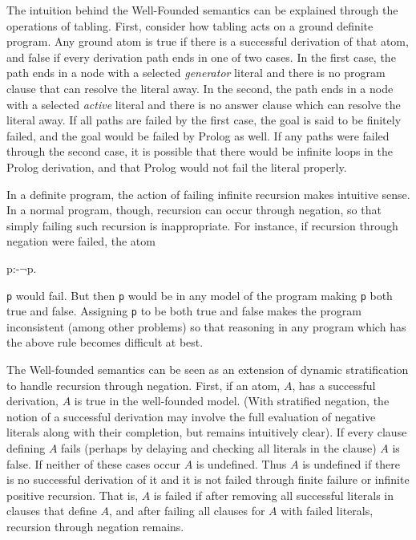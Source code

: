 The intuition behind the Well-Founded semantics can be explained
through the operations of tabling.  First, consider how tabling acts
on a ground definite program.  Any ground atom is true if there is a
successful derivation of that atom, and false if every derivation path
ends in one of two cases.  In the first case, the path ends in a node
with a selected {\em generator} literal and there is no program clause
that can resolve the literal away.  In the second, the path ends in a
node with a selected {\em active} literal and there is no answer
clause which can resolve the literal away.  If all paths are failed by
the first case, the goal is said to be finitely failed, and the goal
would be failed by Prolog as well.  If any paths were failed through
the second case, it is possible that there would be infinite loops in
the Prolog derivation, and that Prolog would not fail the literal
properly.

In a definite program, the action of failing infinite recursion makes
intuitive sense.  In a normal program, though, recursion can occur
through negation, so that simply failing such recursion is
inappropriate.  For instance, if recursion through negation were
failed, the atom
\begin{Prog}
p:-$\neg$p.
\end{Prog}
{\tt p} would fail.  But then {\tt p} would be in any model of the
program making {\tt p} both true and false.  Assigning {\tt p} to be
both true and false makes the program inconsistent (among other
problems) so that reasoning in any program which has the above rule
becomes difficult at best.

The Well-founded semantics can be seen as an extension of dynamic
stratification to handle recursion through negation.  First, if an
atom, $A$, has a successful derivation, $A$ is true in the
well-founded model.  (With stratified negation, the notion of a
successful derivation may involve the full evaluation of negative
literals along with their completion, but remains intuitively clear).
If every clause defining $A$ fails (perhaps by delaying and checking
all literals in the clause) $A$ is false.  If neither of these cases
occur $A$ is undefined.  Thus $A$ is undefined if there is no
successful derivation of it and it is not failed through finite
failure or infinite positive recursion.  That is, $A$ is failed if
after removing all successful literals in clauses that define $A$, and
after failing all clauses for $A$ with failed literals, recursion
through negation remains.

